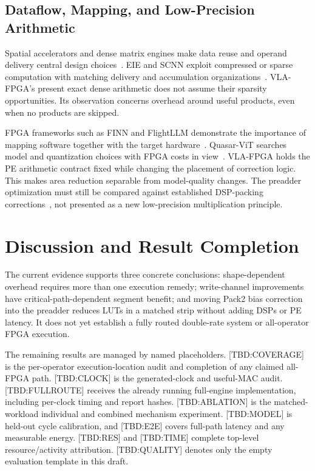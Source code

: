 \documentclass[10pt,conference,letterpaper]{IEEEtran}
\newcommand{\pending}[1]{\textcolor{red!65!black}{\textsf{[TBD:#1]}}}
\begin{document}
\subsection{Dataflow, Mapping, and Low-Precision Arithmetic}
Spatial accelerators and dense matrix engines make data reuse and operand delivery central design choices~\cite{eyeriss,tpu}. EIE and SCNN exploit compressed or sparse computation with matching delivery and accumulation organizations~\cite{eie,scnn}. VLA-FPGA's present exact dense arithmetic does not assume their sparsity opportunities. Its observation concerns overhead around useful products, even when no products are skipped.

FPGA frameworks such as FINN and FlightLLM demonstrate the importance of mapping software together with the target hardware~\cite{finn,flight}. Quasar-ViT searches model and quantization choices with FPGA costs in view~\cite{quasar}. VLA-FPGA holds the PE arithmetic contract fixed while changing the placement of correction logic. This makes area reduction separable from model-quality changes. The preadder optimization must still be compared against established DSP-packing corrections~\cite{packing}, not presented as a new low-precision multiplication principle.

\section{Discussion and Result Completion}
\label{sec:status}
The current evidence supports three concrete conclusions: shape-dependent overhead requires more than one execution remedy; write-channel improvements have critical-path-dependent segment benefit; and moving Pack2 bias correction into the preadder reduces LUTs in a matched strip without adding DSPs or PE latency. It does not yet establish a fully routed double-rate system or all-operator FPGA execution.

The remaining results are managed by named placeholders. \pending{COVERAGE} is the per-operator execution-location audit and completion of any claimed all-FPGA path. \pending{CLOCK} is the generated-clock and useful-MAC audit. \pending{FULLROUTE} receives the already running full-engine implementation, including per-clock timing and report hashes. \pending{ABLATION} is the matched-workload individual and combined mechanism experiment. \pending{MODEL} is held-out cycle calibration, and \pending{E2E} covers full-path latency and any measurable energy. \pending{RES} and \pending{TIME} complete top-level resource/activity attribution. \pending{QUALITY} denotes only the empty evaluation template in this draft.
\end{document}
